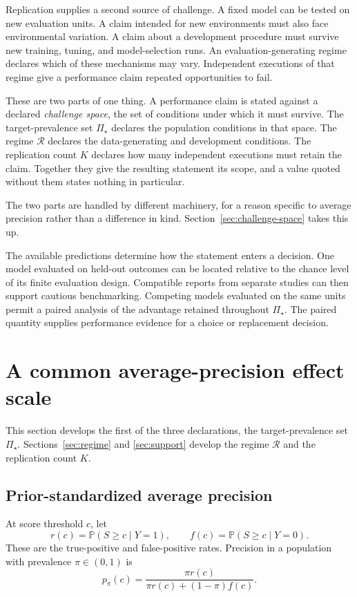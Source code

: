 \documentclass[11pt]{article}
\newcommand{\Regime}{\mathcal{R}}
\newcommand{\PSet}{\Pi_\star}
\newcommand{\Prb}{\mathbb{P}}
\theoremstyle{remark}
\begin{document}
Replication supplies a second source of challenge. A fixed model can be tested on new evaluation units. A claim intended for new environments must also face environmental variation. A claim about a development procedure must survive new training, tuning, and model-selection runs. An evaluation-generating regime declares which of these mechanisms may vary. Independent executions of that regime give a performance claim repeated opportunities to fail.

These are two parts of one thing. A performance claim is stated against a declared \emph{challenge space}, the set of conditions under which it must survive. The target-prevalence set $\PSet$ declares the population conditions in that space. The regime $\Regime$ declares the data-generating and development conditions. The replication count $K$ declares how many independent executions must retain the claim. Together they give the resulting statement its scope, and a value quoted without them states nothing in particular.

The two parts are handled by different machinery, for a reason specific to average precision rather than a difference in kind. Section~\ref{sec:challenge-space} takes this up.

The available predictions determine how the statement enters a decision. One model evaluated on held-out outcomes can be located relative to the chance level of its finite evaluation design. Compatible reports from separate studies can then support cautious benchmarking. Competing models evaluated on the same units permit a paired analysis of the advantage retained throughout $\PSet$. The paired quantity supplies performance evidence for a choice or replacement decision.

\section{A common average-precision effect scale}
\label{sec:common-scale}

This section develops the first of the three declarations, the target-prevalence set $\PSet$. Sections~\ref{sec:regime} and \ref{sec:support} develop the regime $\Regime$ and the replication count $K$.

\subsection{Prior-standardized average precision}

At score threshold $c$, let
\[
r(c)=\Prb(S\geq c\mid Y=1),
\qquad
f(c)=\Prb(S\geq c\mid Y=0).
\]
These are the true-positive and false-positive rates. Precision in a population with prevalence $\pi\in(0,1)$ is
\begin{equation}
p_\pi(c)
=
\frac{\pi r(c)}
{\pi r(c)+(1-\pi)f(c)}.
\label{eq:reference-precision}
\end{equation}
\end{document}
